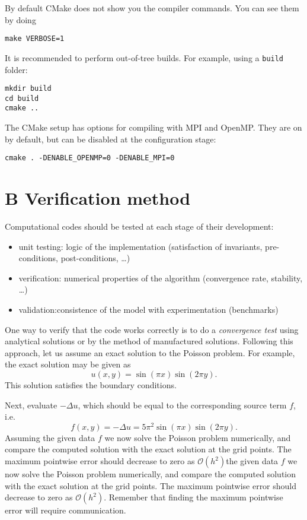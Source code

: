 \documentclass[onecolumn, oneside, a4paper, 11pt]{memoir}
\theoremstyle{remark}
\begin{document}
By default CMake does not show you the compiler commands. You can see them by doing
\begin{lstlisting}
make VERBOSE=1
\end{lstlisting}

It is recommended to perform out-of-tree builds. For example, using a
\texttt{build} folder:
\begin{lstlisting}
mkdir build
cd build
cmake ..
\end{lstlisting}

The CMake setup has options for compiling with MPI and OpenMP. They are on by
default, but can be disabled at the configuration stage:
\begin{lstlisting}
cmake . -DENABLE_OPENMP=0 -DENABLE_MPI=0
\end{lstlisting}

\section{B \quad Verification method}

Computational codes should be tested at each stage of their development:
\begin{itemize}
\item unit testing: logic of the implementation (satisfaction of invariants, pre-conditions, post-conditions, \dots)
\item verification: numerical properties of the algorithm (convergence rate, stability, \dots)
\item validation:consistence of the model with experimentation (benchmarks)
\end{itemize}

One way to verify that the code works correctly is to do a \emph{convergence
  test} using analytical solutions or by the method of manufactured solutions.
Following this approach, let us assume an exact solution to the
Poisson problem. For example, the exact solution may be given as
\[
  u(x,y) = \sin(\pi x) \sin(2\pi y).
\]
This solution satisfies the boundary conditions.

Next, evaluate $-\Delta u$, which should be equal to the corresponding source term $f$, i.e.
\[
  f(x,y) = -\Delta u = 5\pi^2 \sin(\pi x) \sin(2\pi y).
\]
Assuming the given data $f$ we now solve the Poisson problem numerically, and
compare the computed solution with the exact solution at the grid points. The
maximum pointwise error should decrease to zero as $\mathcal{O}(h^2)$the given
data $f$ we now solve the Poisson problem numerically, and compare the computed
solution with the exact solution at the grid points. The maximum pointwise error
should decrease to zero as $\mathcal{O}(h^2)$. Remember that finding the maximum
pointwise error will require communication.
\end{document}
